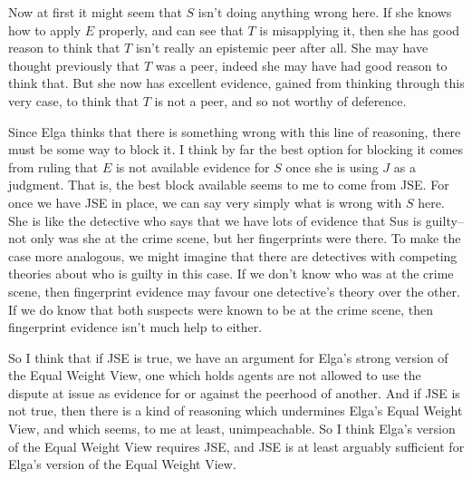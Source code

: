 Now at first it might seem that \(S\) isn't doing anything wrong here. If she knows how to apply \(E\) properly, and can see that \(T\) is misapplying it, then she has good reason to think that \(T\) isn't really an epistemic peer after all. She may have thought previously that \(T\) was a peer, indeed she may have had good reason to think that. But she now has excellent evidence, gained from thinking through this very case, to think that \(T\) is not a peer, and so not worthy of deference.

Since Elga thinks that there is something wrong with this line of reasoning, there must be some way to block it. I think by far the best option for blocking it comes from ruling that \(E\) is not available evidence for \(S\) once she is using \(J\) as a judgment. That is, the best block available seems to me to come from JSE. For once we have JSE in place, we can say very simply what is wrong with \(S\) here. She is like the detective who says that we have lots of evidence that Sus is guilty--not only was she at the crime scene, but her fingerprints were there. To make the case more analogous, we might imagine that there are detectives with competing theories about who is guilty in this case. If we don't know who was at the crime scene, then fingerprint evidence may favour one detective's theory over the other. If we do know that both suspects were known to be at the crime scene, then fingerprint evidence isn't much help to either.

So I think that if JSE is true, we have an argument for Elga's strong version of the Equal Weight View, one which holds agents are not allowed to use the dispute at issue as evidence for or against the peerhood of another. And if JSE is not true, then there is a kind of reasoning which undermines Elga's Equal Weight View, and which seems, to me at least, unimpeachable. So I think Elga's version of the Equal Weight View requires JSE, and JSE is at least arguably sufficient for Elga's version of the Equal Weight View.

